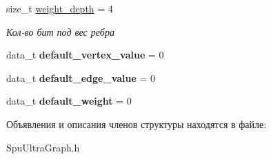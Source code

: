 \begin{DoxyCompactItemize}
\mbox{\label{struct_s_p_u___g_r_a_p_h_1_1_spu_ultra_graph_traits_a2e7eef788286039f97344f682ba16138}} 
size\+\_\+t \hyperlink{struct_s_p_u___g_r_a_p_h_1_1_spu_ultra_graph_traits_a2e7eef788286039f97344f682ba16138}{weight\+\_\+depth} = 4
\begin{DoxyCompactList}\small\item\em Кол-\/во бит под вес ребра \end{DoxyCompactList}\item 
\mbox{\label{struct_s_p_u___g_r_a_p_h_1_1_spu_ultra_graph_traits_a6b9fee19a36b2f83c7cfc98b1067647b}} 
data\+\_\+t {\bfseries default\+\_\+vertex\+\_\+value} = 0
\item 
\mbox{\label{struct_s_p_u___g_r_a_p_h_1_1_spu_ultra_graph_traits_accc2d70f8bb9550d7371b9465c9bb9fb}} 
data\+\_\+t {\bfseries default\+\_\+edge\+\_\+value} = 0
\item 
\mbox{\label{struct_s_p_u___g_r_a_p_h_1_1_spu_ultra_graph_traits_a46908d59da7ab7b6b40e26514479dcf1}} 
data\+\_\+t {\bfseries default\+\_\+weight} = 0
\end{DoxyCompactItemize}


Объявления и описания членов структуры находятся в файле\+:\begin{DoxyCompactItemize}
\item 
Spu\+Ultra\+Graph.\+h\end{DoxyCompactItemize}
